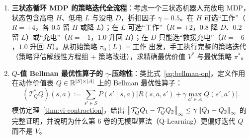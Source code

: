 
\begin{enumerate}[label=\textbf{6.\arabic*}, resume]
  \item \textbf{三状态循环 MDP 的策略迭代全流程}：考虑一个三状态机器人充放电 MDP，状态包含高电 $H$、低电 $L$ 与没电 $D$，折扣因子 $\gamma = 0.5$。在 $H$ 可选“工作”（$R=+4$，各 $0.5$ 留 $H$ 或降 $L$）；在 $L$ 可选“工作”（$R=+2$，$0.8$ 降 $D$、$0.2$ 留 $L$）或“充电”（$R=-1$，$1.0$ 升回 $H$）；在 $D$ 只能选“救援充电”（$R=-6$，$1.0$ 升回 $H$）。从初始策略 $\pi_0(L)=\text{工作}$ 出发，手工执行完整的策略迭代（策略评估解线性方程组 + 策略改进），求精确最优价值 $V^*$ 与最优策略 $\pi^*$。

  \item \textbf{$Q$-值 Bellman 最优性算子的 $\gamma$-压缩性}：类比式~\eqref{eq:bellman-op}，定义作用在动作价值表 $Q \in \mathbb{R}^{|S|\times |A|}$ 上的 Bellman 最优性算子：
  \[
    (\mathcal{T}_Q^* Q)(s, a) := \sum_{s' \in S} P(s' \mid s, a)\Big[R(s, a, s') + \gamma \max_{a' \in A} Q(s', a')\Big].
  \]
  模仿定理~\ref{thm:vi-contraction}，给出 $\left\|\mathcal{T}_Q^* Q_1 - \mathcal{T}_Q^* Q_2\right\|_\infty \le \gamma \left\|Q_1 - Q_2\right\|_\infty$ 的完整证明，并说明为什么第 6 卷的无模型算法（Q-Learning）更偏好迭代 $Q$ 而不是 $V$。
\end{enumerate}


